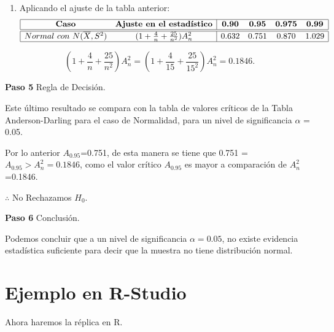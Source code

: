 \documentclass[
  a4paper,
  oneside,
  openany]{book}
\providecommand{\tightlist}{%
  \setlength{\itemsep}{0pt}\setlength{\parskip}{0pt}}
\begin{document}
\begin{enumerate}
\def\labelenumi{\arabic{enumi})}
\setcounter{enumi}{7}
\tightlist
\item
  Aplicando el ajuste de la tabla anterior:
  \[
  \begin{array}{|c c| c c c c|}
  \hline
  \textbf{Caso} & \textbf{Ajuste en el estadístico} &\textbf{0.90} &\textbf{0.95} & \textbf{0.975} & \textbf{0.99} \\
  \hline
  \hline
  Normal\ con\ N(\overline{X},S^2) & (1+\frac{4}{n}+\frac{25}{n^2})A_{n}^{2} & 0.632 & 0.751 & 0.870 & 1.029 \\
  \hline
  \end{array}
  \]
\end{enumerate}

\[ (1+\frac{4}{n}+\frac{25}{n^2})A_{n}^{2}=(1+\frac{4}{15}+\frac{25}{15^2})A_{n}^{2}=0.1846.\]

\textbf{Paso 5} Regla de Decisión.

Este último resultado se compara con la tabla de valores críticos de la Tabla Anderson-Darling para el caso de Normalidad, para un nivel de significancia \(\alpha\) = 0.05.

Por lo anterior \(A_{0.95}\)=0.751, de esta manera se tiene que 0.751 = \(A_{0.95} > A_{n}^2=0.1846\), como el valor crítico \(A_{0.95}\) es mayor a comparación de \(A_{n}^2\)=0.1846.

\(\therefore\) No Rechazamos \(H_0\).

\textbf{Paso 6} Conclusión.

Podemos concluir que a un nivel de significancia \(\alpha=0.05\), no existe evidencia estadística suficiente para decir que la muestra no tiene distribución normal.

\hypertarget{ejemplo-en-r-studio-17}{%
\section{Ejemplo en R-Studio}\label{ejemplo-en-r-studio-17}}

Ahora haremos la réplica en R.
\end{document}
